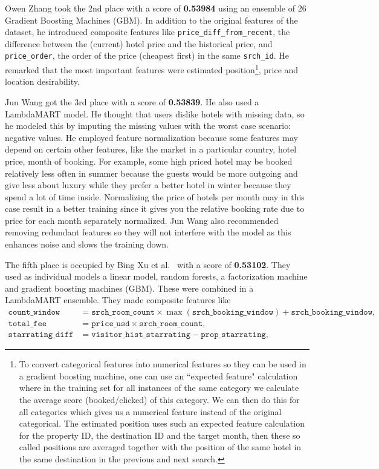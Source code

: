 \documentclass[runningheads,a4paper]{llncs}
\begin{document}
Owen Zhang took the 2nd place with a score of \textbf{0.53984} using an ensemble 
of 26 Gradient Boosting Machines (GBM). In addition to the original features of 
the dataset, he introduced composite features like \verb|price_diff_from_recent|, 
the difference between the (current) hotel price and the historical price, and 
\verb|price_order|, the order of the price (cheapest first) in the same \verb|srch_id|. 
He remarked that the most important features were estimated position\footnote{To 
convert categorical features into numerical features so they can be used in a gradient boosting machine, one can use an ``expected feature" calculation where in the training set for all instances of the same 
category we calculate the average score (booked/clicked) of this category. We 
can then do this for all categories which gives us a numerical feature instead of the original categorical. The 
estimated position uses such an expected feature calculation for the property ID, 
the destination ID and the target month, then these so called positions are averaged together with the position of the same hotel in the 
same destination in the previous and next search.}, price and location desirability.\cite{kaggle:presentations} 

Jun Wang got the 3rd place with a score of \textbf{0.53839}. He also used a 
LambdaMART model. He thought that users dislike hotels with missing data, so he 
modeled this by imputing the missing values with the worst case scenario: negative 
values. He employed feature normalization because some features may depend on certain other features, like the market in a particular country, hotel price, month of booking. For example, some high priced hotel may be booked relatively less often in summer because the guests would be more outgoing and give less about luxury while they prefer a better hotel in winter because they spend a lot of time inside. Normalizing the price of hotels per month may in this case result in a better training since it gives you the relative booking rate due to price for each month separately normalized. Jun Wang also recommended removing 
redundant features so they will not interfere with the model as this enhances noise and slows the training down.

The fifth place is occupied by Bing Xu et al.~\cite{bing} with a score of 
\textbf{0.53102}. They used as individual models a linear model, random forests, 
a factorization machine and gradient boosting machines (GBM). These were combined 
in a LambdaMART ensemble. They made composite features like 
\begin{align*}
  \mathtt{count\_window} &= \mathtt{srch\_room\_count} \times \max(\mathtt{srch\_booking\_window}) + \mathtt{srch\_booking\_window},\\
  \mathtt{total\_fee} &= \mathtt{price\_usd} \times \mathtt{srch\_room\_count}, \\
  \mathtt{starrating\_diff} &= \mathtt{visitor\_hist\_starrating} - \mathtt{prop\_starrating},
\end{align*}
\end{document}
